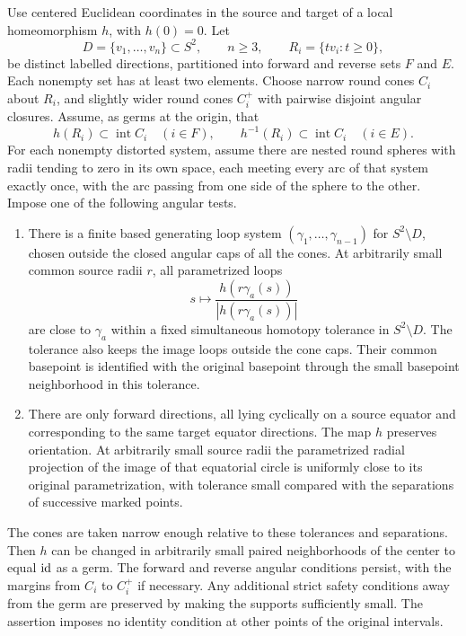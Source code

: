 \begin{proposition}\label{lt:star-replacement}\label{lt:star}
Use centered Euclidean coordinates in the source and target of a local
homeomorphism $h$, with $h(0)=0$.  Let
\[
 D=\{v_1,\ldots,v_n\}\subset S^2,\qquad n\geq3,
 \qquad R_i=\{t v_i:t\geq0\},
\]
be distinct labelled directions, partitioned into forward and reverse
sets $F$ and $E$.  Each nonempty set has at least two elements.
Choose narrow round cones $C_i$ about $R_i$, and slightly wider round
cones $C_i^+$ with pairwise disjoint angular closures.  Assume, as germs
at the origin, that
\[
 h(R_i)\subset\operatorname{int}C_i\quad(i\in F),
 \qquad h^{-1}(R_i)\subset\operatorname{int}C_i\quad(i\in E).
\]
For each nonempty distorted system, assume there are nested round
spheres with radii tending to zero in its own space, each meeting every
arc of that system exactly once, with the arc passing from one side of
the sphere to the other.  Impose one of the following angular tests.
\begin{enumerate}
\item There is a finite based generating loop system
$(\gamma_1,\ldots,\gamma_{n-1})$ for $S^2\setminus D$, chosen outside
the closed angular caps of all the cones.  At arbitrarily small common
source radii $r$, all parametrized loops
\[
 s\longmapsto \frac{h(r\gamma_a(s))}{|h(r\gamma_a(s))|}
\]
are close to $\gamma_a$ within a fixed simultaneous homotopy tolerance
in $S^2\setminus D$.  The tolerance also keeps the image loops outside
the cone caps.  Their common basepoint is identified with the original
basepoint through the small basepoint neighborhood in this tolerance.
\item There are only forward directions, all lying cyclically on a
source equator and corresponding to the same target equator
directions.  The map $h$ preserves orientation.  At arbitrarily small
source radii the parametrized radial projection of the image of that
equatorial circle is uniformly close to its original parametrization,
with tolerance small compared with the separations of successive
marked points.
\end{enumerate}
The cones are taken narrow enough relative to these tolerances and
separations.  Then $h$ can be changed in arbitrarily small paired
neighborhoods of the center to equal $\operatorname{id}$ as a germ.  The forward and
reverse angular conditions persist, with the margins from $C_i$ to
$C_i^+$ if necessary.  Any additional strict safety conditions away
from the germ are preserved by making the supports sufficiently small.
The assertion imposes no identity condition at other points of the
original intervals.
\end{proposition}

